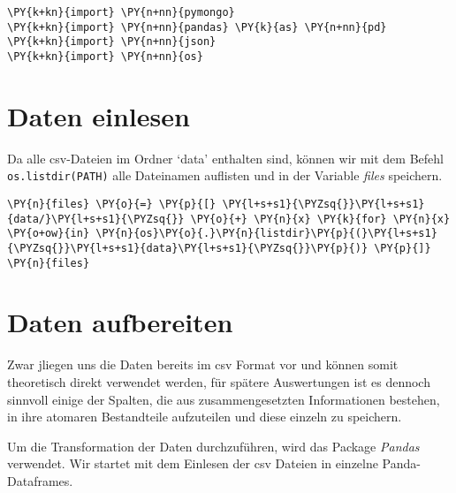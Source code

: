 
    

\begin{tcolorbox}[breakable, size=fbox, boxrule=1pt, pad at break*=1mm,colback=cellbackground, colframe=cellborder]
\begin{Verbatim}[commandchars=\\\{\}]
\PY{k+kn}{import} \PY{n+nn}{pymongo}
\PY{k+kn}{import} \PY{n+nn}{pandas} \PY{k}{as} \PY{n+nn}{pd}
\PY{k+kn}{import} \PY{n+nn}{json}
\PY{k+kn}{import} \PY{n+nn}{os}
\end{Verbatim}
\end{tcolorbox}

    \hypertarget{daten-einlesen}{%
\section{Daten einlesen}\label{daten-einlesen}}

    Da alle csv-Dateien im Ordner `data' enthalten sind, können wir mit dem
Befehl \texttt{os.listdir(PATH)} alle Dateinamen auflisten und in der
Variable \emph{files} speichern.

    \begin{tcolorbox}[breakable, size=fbox, boxrule=1pt, pad at break*=1mm,colback=cellbackground, colframe=cellborder]
\begin{Verbatim}[commandchars=\\\{\}]
\PY{n}{files} \PY{o}{=} \PY{p}{[} \PY{l+s+s1}{\PYZsq{}}\PY{l+s+s1}{data/}\PY{l+s+s1}{\PYZsq{}} \PY{o}{+} \PY{n}{x} \PY{k}{for} \PY{n}{x} \PY{o+ow}{in} \PY{n}{os}\PY{o}{.}\PY{n}{listdir}\PY{p}{(}\PY{l+s+s1}{\PYZsq{}}\PY{l+s+s1}{data}\PY{l+s+s1}{\PYZsq{}}\PY{p}{)} \PY{p}{]}
\PY{n}{files}
\end{Verbatim}
\end{tcolorbox}

    \hypertarget{daten-aufbereiten}{%
\section{Daten aufbereiten}\label{daten-aufbereiten}}

    Zwar jliegen uns die Daten bereits im csv Format vor und können somit
theoretisch direkt verwendet werden, für spätere Auswertungen ist es
dennoch sinnvoll einige der Spalten, die aus zusammengesetzten
Informationen bestehen, in ihre atomaren Bestandteile aufzuteilen und
diese einzeln zu speichern.

Um die Transformation der Daten durchzuführen, wird das Package
\emph{Pandas} verwendet. Wir startet mit dem Einlesen der csv Dateien in
einzelne Panda-Dataframes.


